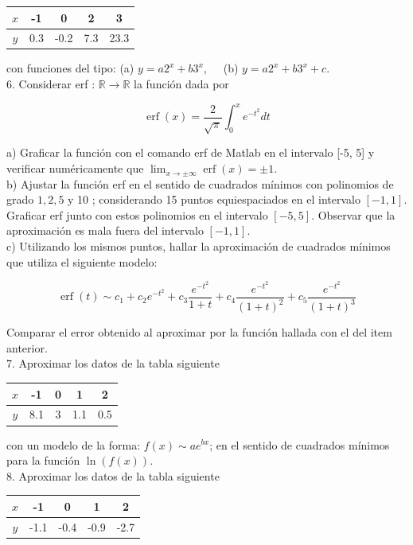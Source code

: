 \documentclass[10pt]{article}
\begin{document}
\begin{center}
\begin{tabular}{|c|c|c|c|c|}
\hline
$x$ & -1 & 0 & 2 & 3 \\
\hline
$y$ & 0.3 & -0.2 & 7.3 & 23.3 \\
\hline
\end{tabular}
\end{center}

con funciones del tipo: (a) $y=a 2^{x}+b 3^{x}, \quad$ (b) $y=a 2^{x}+b 3^{x}+c$.\\
6. Considerar erf : $\mathbb{R} \rightarrow \mathbb{R}$ la función dada por

$$
\operatorname{erf}(x)=\frac{2}{\sqrt{\pi}} \int_{0}^{x} e^{-t^{2}} d t
$$

a) Graficar la función con el comando erf de Matlab en el intervalo [-5, 5] y verificar numéricamente que $\lim _{x \rightarrow \pm \infty} \operatorname{erf}(x)= \pm 1$.\\
b) Ajustar la función erf en el sentido de cuadrados mínimos con polinomios de grado $1,2,5$ y 10 ; considerando 15 puntos equiespaciados en el intervalo $[-1,1]$. Graficar erf junto con estos polinomios en el intervalo $[-5,5]$. Observar que la aproximación es mala fuera del intervalo $[-1,1]$.\\
c) Utilizando los mismos puntos, hallar la aproximación de cuadrados mínimos que utiliza el siguiente modelo:

$$
\operatorname{erf}(t) \sim c_{1}+c_{2} e^{-t^{2}}+c_{3} \frac{e^{-t^{2}}}{1+t}+c_{4} \frac{e^{-t^{2}}}{(1+t)^{2}}+c_{5} \frac{e^{-t^{2}}}{(1+t)^{3}}
$$

Comparar el error obtenido al aproximar por la función hallada con el del item anterior.\\
7. Aproximar los datos de la tabla siguiente

\begin{center}
\begin{tabular}{|c|c|c|c|c|}
\hline
$x$ & -1 & 0 & 1 & 2 \\
\hline
$y$ & 8.1 & 3 & 1.1 & 0.5 \\
\hline
\end{tabular}
\end{center}

con un modelo de la forma: $f(x) \sim a e^{b x}$; en el sentido de cuadrados mínimos para la función $\ln (f(x))$.\\
8. Aproximar los datos de la tabla siguiente

\begin{center}
\begin{tabular}{|c|c|c|c|c|}
\hline
$x$ & -1 & 0 & 1 & 2 \\
\hline
$y$ & -1.1 & -0.4 & -0.9 & -2.7 \\
\hline
\end{tabular}
\end{center}
\end{document}
